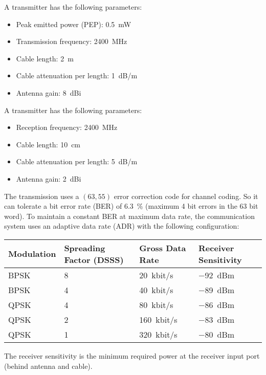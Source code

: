 \begin{question}[subtitle={Link Budget}]
	A transmitter has the following parameters:
	\begin{itemize}
		\item Peak emitted power (PEP): \SI{0.5}{mW}
		\item Transmission frequency: \SI{2400}{MHz}
		\item Cable length: \SI{2}{m}
		\item Cable attenuation per length: \SI{1}{dB/m}
		\item Antenna gain: \SI{8}{dBi}
	\end{itemize}

	A transmitter has the following parameters:
	\begin{itemize}
		\item Reception frequency: \SI{2400}{MHz}
		\item Cable length: \SI{10}{cm}
		\item Cable attenuation per length: \SI{5}{dB/m}
		\item Antenna gain: \SI{2}{dBi}
	\end{itemize}

	The transmission uses a $(63,55)$ error correction code for channel coding. So it can tolerate a bit error rate (BER) of \SI{6.3}{\percent} (maximum 4 bit errors in the 63 bit word). To maintain a constant BER at maximum data rate, the communication system uses an adaptive data rate (ADR) with the following configuration:
	\begin{table}[H]
		\centering
		\begin{tabular}{|l|l|l|l|}
			\hline
			Modulation & Spreading Factor (DSSS) & Gross Data Rate & Receiver Sensitivity \\
			\hline
			BPSK & 8 & \SI{20}{kbit/s} & \SI{-92}{dBm} \\
			\hline
			BPSK & 4 & \SI{40}{kbit/s} & \SI{-89}{dBm} \\
			\hline
			QPSK & 4 & \SI{80}{kbit/s} & \SI{-86}{dBm} \\
			\hline
			QPSK & 2 & \SI{160}{kbit/s} & \SI{-83}{dBm} \\
			\hline
			QPSK & 1 & \SI{320}{kbit/s} & \SI{-80}{dBm} \\
			\hline
		\end{tabular}
	\end{table}
	The receiver sensitivity is the minimum required power at the receiver input port (behind antenna and cable).


\end{question}
